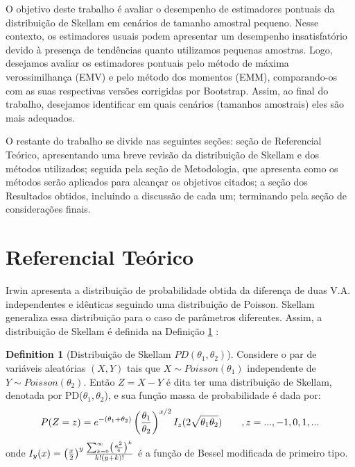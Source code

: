\documentclass[12pt]{article}
\theoremstyle{definition}
\newtheorem{definition}{Definition}[section]
\begin{document}
O objetivo deste trabalho é avaliar o desempenho de estimadores pontuais da distribuição de Skellam em cenários de tamanho amostral pequeno. Nesse contexto, os estimadores usuais podem apresentar um desempenho insatisfatório devido à presença de tendências quanto utilizamos pequenas amostras. Logo, desejamos avaliar os estimadores pontuais pelo método de máxima verossimilhança (EMV) e pelo método dos momentos (EMM), comparando-os com as suas respectivas versões corrigidas por Bootstrap. Assim, ao final do trabalho, desejamos identificar em quais cenários (tamanhos amostrais) eles são mais adequados.

O restante do trabalho se divide nas seguintes seções: seção de Referencial Teórico, apresentando uma breve revisão da distribuição de Skellam e dos métodos utilizados; seguida pela seção de Metodologia, que apresenta como os métodos serão aplicados para alcançar os objetivos citados; a seção dos Resultados obtidos, incluindo a discussão de cada um; terminando pela seção de considerações finais.


\section{Referencial Teórico}

Irwin \cite{irwin1937} apresenta a distribuição de probabilidade obtida da diferença de duas V.A. independentes e idênticas seguindo uma distribuição de Poisson. Skellam \cite{skellam1946} generaliza essa distribuição para o caso de parâmetros diferentes. Assim, a distribuição de Skellam é definida na Definição \ref{def:pmf} \cite{karlis2008}:

\begin{definition}[Distribuição de Skellam $PD(\theta_1, \theta_2)$]
    \label{def:pmf}
    Considere o par de variáveis aleatórias $(X,Y)$ tais que $X \sim Poisson(\theta_1)$ independente de $Y \sim Poisson(\theta_2)$. Então $Z=X-Y$ é dita ter uma distribuição de Skellam, denotada por PD($\theta_1, \theta_2$), e sua função massa de probabilidade é dada por:
    \begin{equation*}
      P(Z=z) = e^{-(\theta_1+\theta_2)} \left({\theta_1\over\theta_2}\right)^{x/2}I_{z}(2\sqrt{\theta_1\theta_2}) \qquad, z=...,-1,0,1,...
    \end{equation*}
    onde $I_y(x) = \left ( x \over 2 \right )^y { \sum_{k=0}^{\infty}  \left ( x^2 \over 4 \right )^k \over k! (y+k)! }$ é a função de Bessel modificada de primeiro tipo.
\end{definition}
\end{document}
